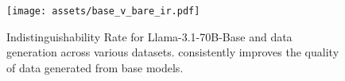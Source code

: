 \begin{figure}[ht]
\vskip 0.2in
\begin{center}
\centerline{\texttt{[image: assets/base\_v\_bare\_ir.pdf]}}
\caption{Indistinguishability Rate for Llama-3.1-70B-Base and \Sys{} data generation across various datasets. \Sys{} consistently improves the quality of data generated from base models.}
\label{ir-lift-plot}
\end{center}
\vskip -0.2in
\end{figure}
